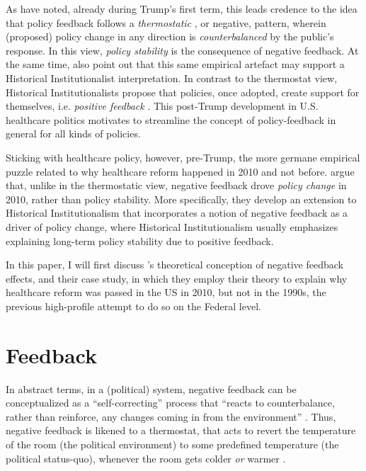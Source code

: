 \documentclass[11pt]{article}
\begin{document}
\begin{figure}[H]
  \sffamily
  
  \label{fig:aca_fav}
\end{figure}

\noindent As \textcite[][]{Busemeyer2019} have noted, already during Trump's first term, this leads credence to the idea that policy feedback follows a \textit{thermostatic} \parencite[][]{Wlezien1995}, or negative, pattern, wherein (proposed) policy change in any direction is \textit{counterbalanced} by the public's response. In this view, \textit{policy stability} is the consequence of negative feedback. At the same time, \textcite[][]{Busemeyer2019} also point out that this same empirical artefact may support a Historical Institutionalist interpretation. In contrast to the thermostat view, Historical Institutionalists propose that policies, once adopted, create support for themselves, i.e. \textit{positive feedback} \parencites[see e.g.][]{Pierson1993}{Pierson2000}. This post-Trump development in U.S. healthcare politics motivates \textcite[][]{Busemeyer2019} to streamline the concept of policy-feedback in general for all kinds of policies.

Sticking with healthcare policy, however, pre-Trump, the more germane empirical puzzle related to why healthcare reform happened in 2010 and not before. \textcite[][]{Jacobs2014} argue that, unlike in the thermostatic view, negative feedback drove \textit{policy change} in 2010, rather than policy stability. More specifically, they develop an extension to Historical Institutionalism that incorporates a notion of negative feedback as a driver of policy change, where Historical Institutionalism usually emphasizes explaining long-term policy stability due to positive feedback.

In this paper, I will first discuss \citeauthor[][]{Jacobs2014}'s \parencite*{Jacobs2014} theoretical conception of negative feedback effects, and their case study, in which they employ their theory to explain why healthcare reform was passed in the US in 2010, but not in the 1990s, the previous high-profile attempt to do so on the Federal level.

\section*{Feedback}

In abstract terms, in a (political) system, negative feedback can be conceptualized as a \enquote{self-correcting} \parencite[][p. 8]{Baumgartner2002} process that \enquote{reacts to counterbalance, rather than reinforce, any changes coming in from the environment} . Thus, negative feedback is likened to a thermostat, that acts to revert the temperature of the room (the political environment) to some predefined temperature (the political status-quo), whenever the room gets colder \textit{or} warmer \parencite[][]{Wlezien1995}.
\end{document}
